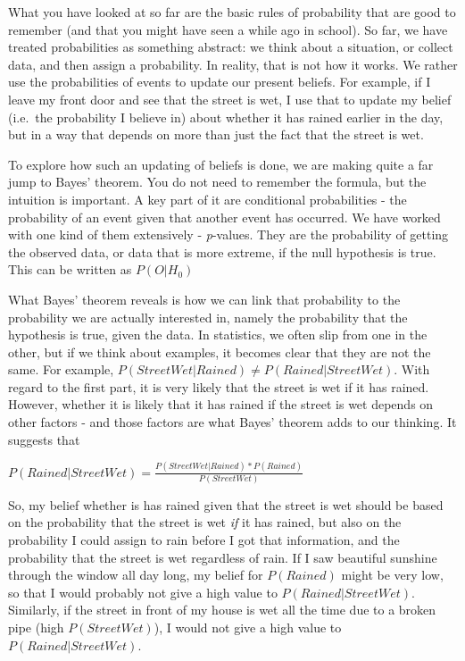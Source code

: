 \documentclass[
]{book}
\begin{document}
What you have looked at so far are the basic rules of probability that are good to remember (and that you might have seen a while ago in school). So far, we have treated probabilities as something abstract: we think about a situation, or collect data, and then assign a probability. In reality, that is not how it works. We rather use the probabilities of events to update our present beliefs. For example, if I leave my front door and see that the street is wet, I use that to update my belief (i.e.~the probability I believe in) about whether it has rained earlier in the day, but in a way that depends on more than just the fact that the street is wet.

To explore how such an updating of beliefs is done, we are making quite a far jump to Bayes' theorem. You do not need to remember the formula, but the intuition is important. A key part of it are conditional probabilities - the probability of an event given that another event has occurred. We have worked with one kind of them extensively - \emph{p}-values. They are the probability of getting the observed data, or data that is more extreme, if the null hypothesis is true. This can be written as \(P(O|H_0)\)

What Bayes' theorem reveals is how we can link that probability to the probability we are actually interested in, namely the probability that the hypothesis is true, given the data. In statistics, we often slip from one in the other, but if we think about examples, it becomes clear that they are not the same. For example, \(P(StreetWet|Rained)\neq P(Rained|StreetWet)\). With regard to the first part, it is very likely that the street is wet if it has rained. However, whether it is likely that it has rained if the street is wet depends on other factors - and those factors are what Bayes' theorem adds to our thinking. It suggests that

\(P(Rained|StreetWet) = \frac{P(StreetWet|Rained)*P(Rained)}{P(StreetWet)}\)

So, my belief whether is has rained given that the street is wet should be based on the probability that the street is wet \emph{if} it has rained, but also on the probability I could assign to rain before I got that information, and the probability that the street is wet regardless of rain. If I saw beautiful sunshine through the window all day long, my belief for \(P(Rained)\) might be very low, so that I would probably not give a high value to \(P(Rained|StreetWet)\). Similarly, if the street in front of my house is wet all the time due to a broken pipe (high \({P(StreetWet)}\)), I would not give a high value to \(P(Rained|StreetWet)\).
\end{document}
